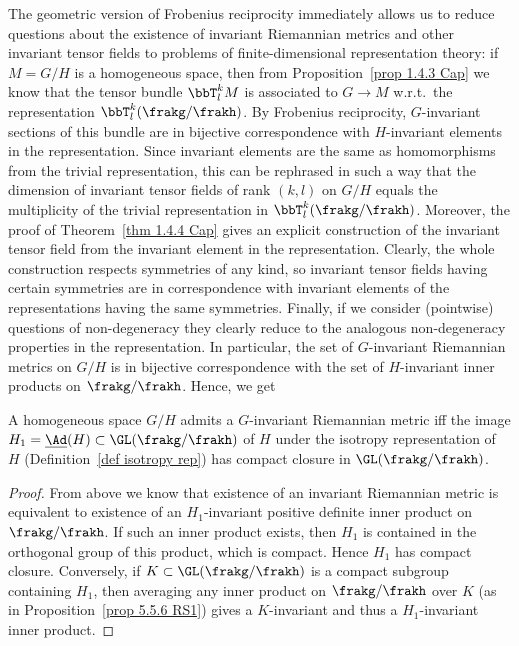 The geometric version of Frobenius reciprocity immediately allows us to reduce questions about the existence of invariant Riemannian metrics and other invariant tensor fields to problems of finite-dimensional representation theory: if $M=G\slash H$ is a homogeneous space, then from Proposition~\ref{prop 1.4.3 Cap} we know that the tensor bundle $\bbT^k_lM$ is associated to $G\to M$ w.r.t.\ the representation $\bbT^k_l(\frakg\slash \frakh)$. By Frobenius reciprocity, $G$-invariant sections of this bundle are in bijective correspondence with $H$-invariant elements in the representation. Since invariant elements are the same as homomorphisms from the trivial representation, this can be rephrased in such a way that the dimension of invariant tensor fields of rank $(k,l)$
on $G\slash H$ equals the multiplicity of the trivial representation in $\bbT^k_l(\frakg\slash\frakh)$. Moreover, the proof of Theorem~\ref{thm 1.4.4 Cap} gives an explicit construction of the invariant tensor field from the invariant element in the representation. Clearly, the whole construction respects symmetries of any kind, so invariant tensor fields having certain symmetries are in correspondence with invariant elements of the representations having the same symmetries. Finally, if we consider (pointwise) questions of non-degeneracy they clearly reduce to the analogous non-degeneracy properties in the representation. In particular, the set of $G$-invariant Riemannian metrics on $G\slash H$ is in bijective correspondence with the set of $H$-invariant inner products on $\frakg\slash\frakh$. Hence, we get
\begin{cor}
    A homogeneous space $G\slash H$ admits a $G$-invariant Riemannian metric iff the image $H_1=\underline{\Ad}(H)\subset \GL(\frakg\slash\frakh)$ of $H$ under the isotropy representation of $H$ (Definition~\ref{def isotropy rep}) has compact closure in $\GL(\frakg\slash\frakh)$.
\end{cor}
\begin{proof}
    From above we know that existence of an invariant Riemannian metric is equivalent to existence of an $H_1$-invariant positive definite inner product on $\frakg\slash\frakh$. If such an inner product exists, then $H_1$ is contained in the orthogonal group of this  product, which is compact. Hence $H_1$ has compact closure. Conversely, if $K\subset \GL(\frakg\slash\frakh)$ is a compact subgroup containing $H_1$, then averaging any inner product on $\frakg\slash\frakh$ over $K$ (as in Proposition~\ref{prop 5.5.6 RS1}) gives a $K$-invariant and thus a $H_1$-invariant inner product.
\end{proof}

